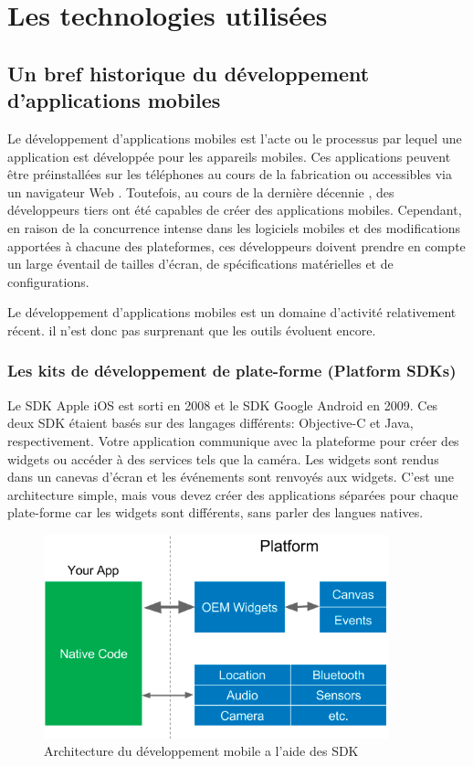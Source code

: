

\chapter{Les technologies utilisées}

\section{Un bref historique du développement d'applications mobiles}
Le développement d'applications mobiles est l'acte ou le processus par lequel une application est développée pour les appareils mobiles. Ces applications peuvent être préinstallées sur les téléphones au cours de la fabrication ou accessibles via un navigateur Web \cite{noauthor_mobile_2019}. Toutefois, au cours de la dernière décennie \cite{leler_whats_2017}, des développeurs tiers ont été capables de créer des applications mobiles. Cependant, en raison de la concurrence intense dans les logiciels mobiles et des modifications apportées à chacune des plateformes, ces développeurs doivent prendre en compte un large éventail de tailles d'écran, de spécifications matérielles et de configurations.

Le développement d'applications mobiles est un domaine d'activité relativement récent. il n’est donc pas surprenant que les outils évoluent encore.
\newpage

\subsection{Les kits de développement de plate-forme (Platform SDKs)}
Le SDK Apple iOS est sorti en 2008 et le \acrshort{SDK} Google Android en 2009. Ces deux SDK étaient basés sur des langages différents: Objective-C et Java, respectivement.
Votre application communique avec la plateforme pour créer des widgets ou accéder à des services tels que la caméra. Les widgets sont rendus dans un canevas d’écran et les événements sont renvoyés aux widgets. C'est une architecture simple, mais vous devez créer des applications séparées pour chaque plate-forme car les widgets sont différents, sans parler des langues natives\cite{leler_whats_2017}.

\begin{figure}[h]
	\begin{center}
		\includegraphics[width=10cm]{Images/chapter2/platform_sdk.png}
		\caption{{\footnotesize Architecture du développement mobile a l'aide des SDK\cite{leler_whats_2017}}}
	\end{center}
\end{figure}

